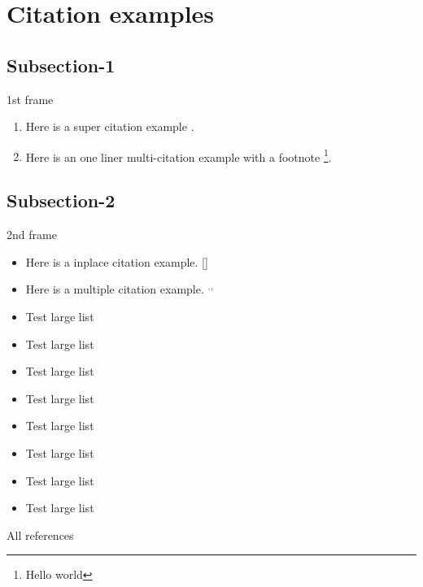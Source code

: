 \section{Citation examples}
\subsection{Subsection-1}
\begin{frame}{1st frame}
\begin{enumerate}

    \item Here is a super citation example \cite{Rubel2014, Nicklas2010}.
    \item Here is an one liner multi-citation example  with a footnote \renewcommand{\thefootnote}{\roman{footnote}}\footnote{Hello world}.
\end{enumerate}
\end{frame}

\subsection{Subsection-2}
\begin{frame}{2nd frame}
    \begin{itemize}
        \item Here is a inplace citation example. [{\scriptsize {}}]
        \item Here is a multiple citation example. $^,$$^,$
        \item Test large list
        \item Test large list
        \item Test large list
        \item Test large list
        \item Test large list
        \item Test large list
        \item Test large list
        \item Test large list
        
    \end{itemize}
\end{frame}

\begin{frame}{All references}
    \printbibliography%
\end{frame}